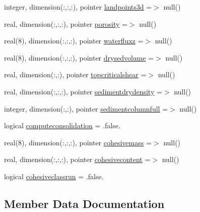 \begin{DoxyCompactItemize}
integer, dimension(\+:,\+:,\+:), pointer \mbox{\hyperlink{structmoduleinterfacesedimentwater_1_1t__ext__sed_a9ea143cc3b7063a5f4651bc9571c4590}{landpoints3d}} =$>$ null()
\item 
real, dimension(\+:,\+:,\+:), pointer \mbox{\hyperlink{structmoduleinterfacesedimentwater_1_1t__ext__sed_a842e0eb83908ccf66b77aff3d57436cd}{porosity}} =$>$ null()
\item 
real(8), dimension(\+:,\+:,\+:), pointer \mbox{\hyperlink{structmoduleinterfacesedimentwater_1_1t__ext__sed_abea47b11ef24cc47b1f8b060421b4fe1}{waterfluxz}} =$>$ null()
\item 
real(8), dimension(\+:,\+:,\+:), pointer \mbox{\hyperlink{structmoduleinterfacesedimentwater_1_1t__ext__sed_ab4bcd8b4413dee7ee164a1a5de4e6ca4}{drysedvolume}} =$>$ null()
\item 
real, dimension(\+:,\+:), pointer \mbox{\hyperlink{structmoduleinterfacesedimentwater_1_1t__ext__sed_a95f1de25e8418315b319e20f9087f669}{topcriticalshear}} =$>$ null()
\item 
real, dimension(\+:,\+:,\+:), pointer \mbox{\hyperlink{structmoduleinterfacesedimentwater_1_1t__ext__sed_aabd6ef41bbbfeeb043ced009a19d3cce}{sedimentdrydensity}} =$>$ null()
\item 
integer, dimension(\+:,\+:), pointer \mbox{\hyperlink{structmoduleinterfacesedimentwater_1_1t__ext__sed_a29e96564adc4caf6d6fe08670c04c6d0}{sedimentcolumnfull}} =$>$ null()
\item 
logical \mbox{\hyperlink{structmoduleinterfacesedimentwater_1_1t__ext__sed_afdb50816552f9f907f421a8a479eaf70}{computeconsolidation}} = .false.
\item 
real(8), dimension(\+:,\+:,\+:), pointer \mbox{\hyperlink{structmoduleinterfacesedimentwater_1_1t__ext__sed_af2df5d28377787d64522a73566258c89}{cohesivemass}} =$>$ null()
\item 
real, dimension(\+:,\+:,\+:), pointer \mbox{\hyperlink{structmoduleinterfacesedimentwater_1_1t__ext__sed_af4a8fd00382c9098f44168c0ad296474}{cohesivecontent}} =$>$ null()
\item 
logical \mbox{\hyperlink{structmoduleinterfacesedimentwater_1_1t__ext__sed_a8db395f3462718ef536c9670983be20e}{cohesiveclassrun}} = .false.
\end{DoxyCompactItemize}


\subsection{Member Data Documentation}
\mbox{\label{structmoduleinterfacesedimentwater_1_1t__ext__sed_a92cc244525fbbb1a078382ded191a75a}} 
